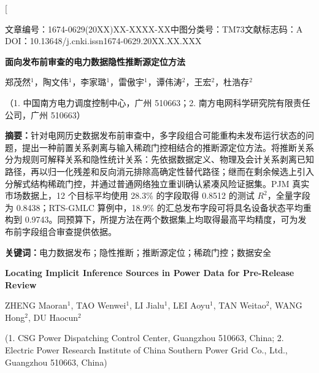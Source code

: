 \documentclass[UTF8,zihao=5,twoside,fontset=none]{ctexart}
\newcommand{\articleinfo}{文章编号：1674-0629(20XX)XX-XXXX-XX\quad 中图分类号：TM73\quad 文献标志码：A\\
DOI：10.13648/j.cnki.issn1674-0629.20XX.XX.XXX}
\begin{document}
\twocolumn[

\begin{center}
{\articleinfo}\par\vspace{1.0em}
{\sffamily{}\bfseries 面向发布前审查的电力数据隐性推断源定位方法}\par\vspace{0.6em}
{郑茂然$^{1}$，陶文伟$^{1}$，李家璐$^{1}$，雷傲宇$^{1}$，谭伟涛$^{2}$，王宏$^{2}$，杜浩存$^{2}$}\par\vspace{0.3em}
{（1. 中国南方电力调度控制中心，广州 510663；2. 南方电网科学研究院有限责任公司，广州 510663）}\par\vspace{0.8em}
\end{center}

\noindent\textbf{摘要：}针对电网历史数据发布前审查中，多字段组合可能重构未发布运行状态的问题，提出一种前置关系剥离与输入稀疏门控相结合的推断源定位方法。将推断关系分为规则可解释关系和隐性统计关系：先依据数据定义、物理及会计关系剥离已知路径，再以归一化残差和反向消元排除高确定性替代路径；继而在剩余候选上引入分解式结构稀疏门控，并通过普通网络独立重训确认紧凑风险证据集。PJM 真实市场数据上，12 个目标平均使用 28.3\% 的字段取得 0.8512 的测试 $R^2$，全量字段为 0.8438；RTS-GMLC 算例中，18.9\% 的汇总发布字段可将具名设备状态平均重构到 0.9743。同预算下，所提方法在两个数据集上均取得最高平均精度，可为发布前字段组合审查提供依据。\par
\noindent\textbf{关键词：}电力数据发布；隐性推断；推断源定位；稀疏门控；数据安全\par\vspace{0.8em}

\begin{center}
{\bfseries\large Locating Implicit Inference Sources in Power Data for Pre-Release Review}\par\vspace{0.5em}
{ZHENG Maoran$^{1}$, TAO Wenwei$^{1}$, LI Jialu$^{1}$, LEI Aoyu$^{1}$, TAN Weitao$^{2}$, WANG Hong$^{2}$, DU Haocun$^{2}$}\par\vspace{0.3em}
{\small (1. CSG Power Dispatching Control Center, Guangzhou 510663, China; 2. Electric Power Research Institute of China Southern Power Grid Co., Ltd., Guangzhou 510663, China)}\par\vspace{0.5em}
\end{center}
\end{document}
